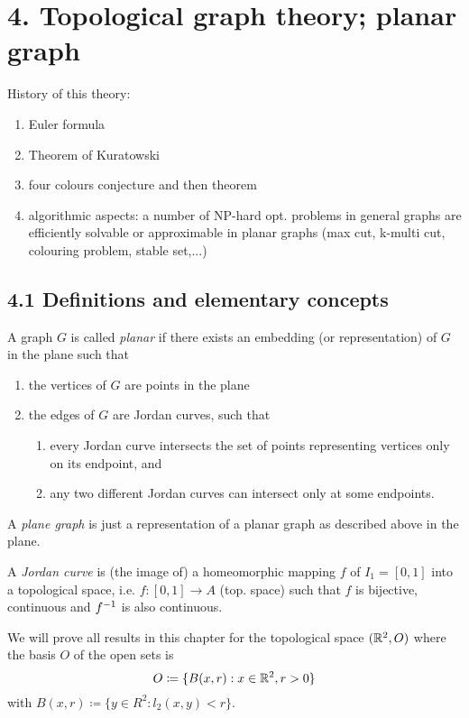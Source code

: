 \documentclass[aagt.tex]{subfiles}
\begin{document}
\section{4. Topological graph theory; planar graph}

History of this theory:
\begin{enumerate}
  \item Euler formula
  \item Theorem of Kuratowski
  \item four colours conjecture and then theorem
  \item algorithmic aspects: a number of NP-hard opt. problems in general graphs are efficiently solvable or approximable in planar graphs (max cut, k-multi cut, colouring problem, stable set,...)
\end{enumerate}

\subsection{4.1 Definitions and elementary concepts}

\begin{defi*}
  A graph $G$ is called \emph{planar} if there exists an embedding (or representation) of $G$ in the plane such that
  \begin{enumerate}
    \item the vertices of $G$ are points in the plane
    \item the edges of $G$ are Jordan curves, such that 
    \begin{enumerate}
      \item every Jordan curve intersects the set of points representing vertices only on its endpoint, and
      \item any two different Jordan curves can intersect only at some endpoints.
    \end{enumerate}
  \end{enumerate}
  A \emph{plane graph} is just a representation of a planar graph as described above in the plane.
\end{defi*}

\begin{defi*}
  A \emph{Jordan curve} is (the image of) a homeomorphic mapping $f$ of $I_1 = [0,1]$ into a topological space,
  i.e. $f: [0,1] \to A$ (top. space) such that $f$ is bijective, continuous and ${f}^{-1}$ is also continuous.
\end{defi*}

We will prove all results in this chapter for the topological space $(\mathbb{R}^2,O)$ where the basis $O$ of the open sets is
\[ O \coloneqq \{B(x,r): x \in \mathbb{R}^2, r>0\} \]
with $B(x,r) \coloneqq \{y \in R^2: l_2(x,y) < r \}$.
\end{document}

